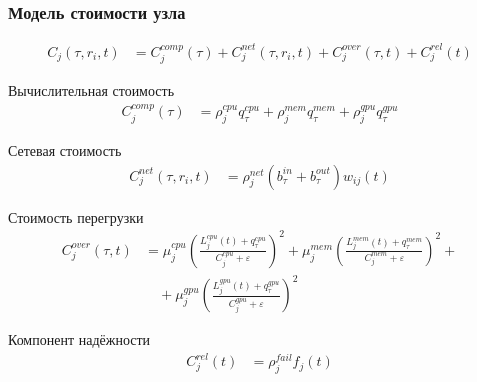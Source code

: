 \begin{frame}
	\frametitle{Модель стоимости узла}
	\small
	\begin{align*}
		C_j(\tau,r_i,t)&=C^{comp}_j(\tau)+C^{net}_j(\tau,r_i,t)+C^{over}_j(\tau,t)+C^{rel}_j(t)
	\end{align*}

	Вычислительная стоимость
	\begin{align*}
		C^{comp}_j(\tau)&=\rho^{cpu}_j q^{cpu}_{\tau}+\rho^{mem}_j q^{mem}_{\tau}+\rho^{gpu}_j q^{gpu}_{\tau}
	\end{align*}

	Сетевая стоимость
	\begin{align*}
		C^{net}_j(\tau,r_i,t)&=\rho^{net}_j\left(b^{in}_{\tau}+b^{out}_{\tau}\right)w_{ij}(t)
	\end{align*}

	Стоимость перегрузки
	\begin{align*}
		C^{over}_j(\tau,t)&=\mu^{cpu}_j\left(\frac{L^{cpu}_j(t)+q^{cpu}_{\tau}}{C^{cpu}_j+\varepsilon}\right)^2+
		\mu^{mem}_j\left(\frac{L^{mem}_j(t)+q^{mem}_{\tau}}{C^{mem}_j+\varepsilon}\right)^2+{}\\[-1mm]
		&\quad{}+\mu^{gpu}_j\left(\frac{L^{gpu}_j(t)+q^{gpu}_{\tau}}{C^{gpu}_j+\varepsilon}\right)^2
	\end{align*}

	Компонент надёжности
	\begin{align*}
		C^{rel}_j(t)&=\rho^{fail}_j f_j(t)
	\end{align*}
\end{frame}

